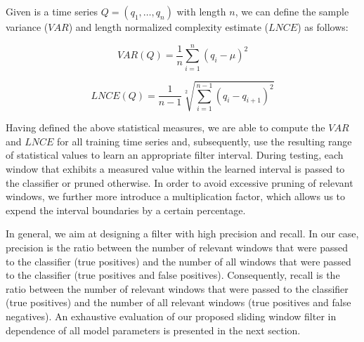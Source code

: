 Given is a time series $Q = (q_1, \dots, q_n)$ with length $n$, we can define the sample variance ($VAR$) and length normalized complexity estimate ($LNCE$) as follows:

\begin{equation}
    VAR(Q) = \frac{1}{n}\sum \limits_{i=1}^{n} (q_i - \mu)^2
\end{equation}

\begin{equation}
    LNCE(Q) = \frac{1}{n-1}\sqrt[2]{\sum \limits_{i=1}^{n-1} (q_i - q_{i + 1})^2}
\end{equation}

Having defined the above statistical measures, we are able to compute the $VAR$ and $LNCE$ for all training time series and, subsequently, use the resulting range of statistical values to learn an appropriate filter interval. During testing, each window that exhibits a measured value within the learned interval is passed to the classifier or pruned otherwise. In order to avoid excessive pruning of relevant windows, we further more introduce a multiplication factor, which allows us to expend the interval boundaries by a certain percentage.

In general, we aim at designing a filter with high precision and recall. In our case, precision is the ratio between the number of relevant windows that were passed to the classifier (true positives) and the number of all windows that were passed to the classifier (true positives and false positives). Consequently, recall is the ratio between the number of relevant windows that were passed to the classifier (true positives) and the number of all relevant windows (true positives and false negatives). An exhaustive evaluation of our proposed sliding window filter in dependence of all model parameters is presented in the next section.
